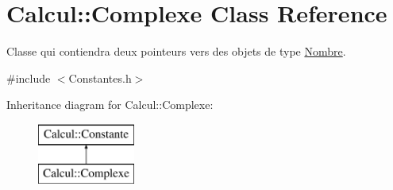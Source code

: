 \hypertarget{class_calcul_1_1_complexe}{\section{Calcul\-:\-:Complexe Class Reference}
\label{class_calcul_1_1_complexe}
}


Classe qui contiendra deux pointeurs vers des objets de type \hyperlink{class_calcul_1_1_nombre}{Nombre}.  




{\ttfamily \#include $<$Constantes.\-h$>$}

Inheritance diagram for Calcul\-:\-:Complexe\-:\begin{figure}[H]
\begin{center}
\leavevmode
\includegraphics[height=2.000000cm]{class_calcul_1_1_complexe}
\end{center}
\end{figure}
